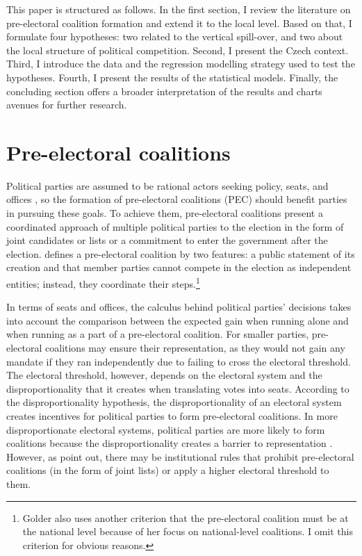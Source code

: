 \documentclass[]{interact}
\theoremstyle{plain}%
\theoremstyle{definition}
\theoremstyle{remark}
\begin{document}
This paper is structured as follows. In the first section, I review the literature on pre-electoral coalition formation and extend it to the local level. Based on that, I formulate four hypotheses: two related to the vertical spill-over, and two about the local structure of political competition. Second, I present the Czech context. Third, I introduce the data and the regression modelling strategy used to test the hypotheses. Fourth, I present the results of the statistical models. Finally, the concluding section offers a broader interpretation of the results and charts avenues for further research. 

\section{Pre-electoral coalitions}

Political parties are assumed to be rational actors seeking policy, seats, and offices \citep{muller1999}, so the formation of pre-electoral coalitions (PEC) should benefit parties in pursuing these goals. To achieve them, pre-electoral coalitions present a coordinated approach of multiple political parties to the election in the form of joint candidates or lists or a commitment to enter the government after the election. \citet[12]{golder2006} defines a pre-electoral coalition by two features: a public statement of its creation and that member parties cannot compete in the election as independent entities; instead, they coordinate their steps.\footnote{Golder also uses another criterion that the pre-electoral coalition must be at the national level because of her focus on national-level coalitions. I omit this criterion for obvious reasons.}

In terms of seats and offices, the calculus behind political parties' decisions takes into account the comparison between the expected gain when running alone and when running as a part of a pre-electoral coalition. For smaller parties, pre-electoral coalitions may ensure their representation, as they would not gain any mandate if they ran independently due to failing to cross the electoral threshold. The electoral threshold, however, depends on the electoral system and the disproportionality that it creates when translating votes into seats. According to the disproportionality hypothesis, the disproportionality of an electoral system creates incentives for political parties to form pre-electoral coalitions. In more disproportionate electoral systems, political parties are more likely to form coalitions because the disproportionality creates a barrier to representation \citep{golder2005}. However, as \citet{ibenskas2018} point out, there may be institutional rules that prohibit pre-electoral coalitions (in the form of joint lists) or apply a higher electoral threshold to them.
\end{document}
